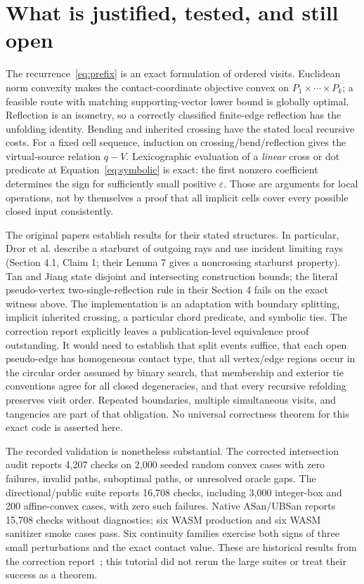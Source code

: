 \documentclass[12pt,a4paper]{article}
\begin{document}
\section{What is justified, tested, and still open}
The recurrence~\eqref{eq:prefix} is an exact formulation of ordered visits. Euclidean norm convexity makes the contact-coordinate objective convex on \(P_1\times\cdots\times P_k\); a feasible route with matching supporting-vector lower bound is globally optimal. Reflection is an isometry, so a correctly classified finite-edge reflection has the unfolding identity. Bending and inherited crossing have the stated local recursive costs. For a fixed cell sequence, induction on crossing/bend/reflection gives the virtual-source relation \(q-V\). Lexicographic evaluation of a \emph{linear} cross or dot predicate at Equation~\eqref{eq:symbolic} is exact: the first nonzero coefficient determines the sign for sufficiently small positive \(\varepsilon\). Those are arguments for local operations, not by themselves a proof that all implicit cells cover every possible closed input consistently.

The original papers establish results for their stated structures. In particular, Dror et al. describe a starburst of outgoing rays and use incident limiting rays (Section 4.1, Claim 1; their Lemma 7 gives a noncrossing starburst property). Tan and Jiang state disjoint and intersecting construction bounds; the literal pseudo-vertex two-single-reflection rule in their Section 4 fails on the exact witness above. The implementation is an adaptation with boundary splitting, implicit inherited crossing, a particular chord predicate, and symbolic ties. The correction report explicitly leaves a publication-level equivalence proof outstanding. It would need to establish that split events suffice, that each open pseudo-edge has homogeneous contact type, that all vertex/edge regions occur in the circular order assumed by binary search, that membership and exterior tie conventions agree for all closed degeneracies, and that every recursive refolding preserves visit order. Repeated boundaries, multiple simultaneous visits, and tangencies are part of that obligation. No universal correctness theorem for this exact code is asserted here.

The recorded validation is nonetheless substantial. The corrected intersection audit reports 4,207 checks on 2,000 seeded random convex cases with zero failures, invalid paths, suboptimal paths, or unresolved oracle gaps. The directional/public suite reports 16,708 checks, including 3,000 integer-box and 200 affine-convex cases, with zero such failures. Native ASan/UBSan reports 15,708 checks without diagnostics; six WASM production and six WASM sanitizer smoke cases pass. Six continuity families exercise both signs of three small perturbations and the exact contact value. These are historical results from the correction report~\cite{correction}; this tutorial did not rerun the large suites or treat their success as a theorem.
\end{document}
